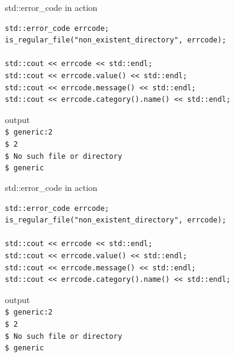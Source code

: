 \documentclass[10pt]{beamer}
\begin{document}
\begin{frame}[fragile]{std::error\_code in action}
	\begin{verbatim}
std::error_code errcode;
is_regular_file("non_existent_directory", errcode);

std::cout << errcode << std::endl;
std::cout << errcode.value() << std::endl;
std::cout << errcode.message() << std::endl;
std::cout << errcode.category().name() << std::endl;
	\end{verbatim}
	
	\hrulefill
	
	\begin{block}{output}
	\texttt{\\
		\$ \alert{generic:2} \\
		\$ 2 \\
		\$ No such file or directory \\
		\$ generic}	
	\end{block}
	
\end{frame}

\begin{frame}[fragile]{std::error\_code in action}
	\begin{verbatim}
std::error_code errcode;
is_regular_file("non_existent_directory", errcode);

std::cout << errcode << std::endl;
std::cout << errcode.value() << std::endl;
std::cout << errcode.message() << std::endl;
std::cout << errcode.category().name() << std::endl;
	\end{verbatim}
	
	\hrulefill
	
	\begin{block}{output}
	\texttt{\\
		\$ generic:2 \\
		\$ \alert{2} \\
		\$ No such file or directory \\
		\$ generic}	
	\end{block}
	
\end{frame}
\end{document}
